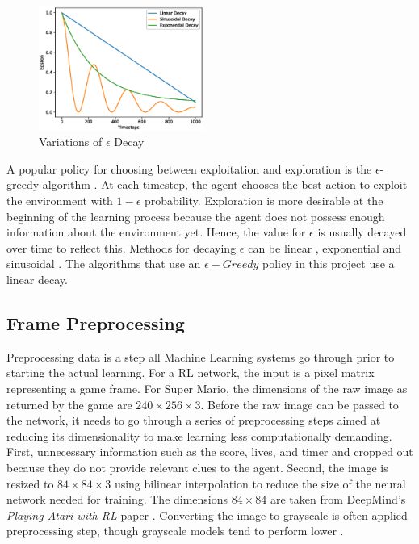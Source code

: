 \documentclass[notitlepage,a4paper,11pt]{article}
\begin{document}
\begin{figure}
\vspace{-40pt}
  \begin{center}
    \includegraphics[width=0.48\textwidth]{figs/epsilon_decay.eps}
  \end{center}
  \vspace{-20pt}
  \caption{Variations of $\epsilon$ Decay}
\end{figure}

A popular policy for choosing between exploitation and exploration is the $\epsilon$-greedy algorithm \cite{white2012bandit}. At each timestep, the agent chooses the best action to exploit the environment with $1-\epsilon$ probability. Exploration is more desirable at the beginning of the learning process because the agent does not possess enough information about the environment yet. Hence, the value for $\epsilon$ is usually decayed over time to reflect this. Methods for decaying $\epsilon$ can be linear \cite{mnih2015human}, exponential \cite{maroti2019rbed} and sinusoidal  \cite{chuchro2017game}. The algorithms that use an $\epsilon-Greedy$ policy in this project use a linear decay.


\subsection{Frame Preprocessing} \label{frame_preprocessing}
Preprocessing data is a step all Machine Learning systems go through prior to starting the actual learning. For a RL network, the input is a pixel matrix representing a game frame. For Super Mario, the dimensions of the raw image as returned by the game are $240 \times 256 \times 3$. Before the raw image can be passed to the network, it needs to go through a series of preprocessing steps aimed at reducing its dimensionality to make learning less computationally demanding. First, unnecessary information such as the score, lives, and timer and cropped out because they do not provide relevant clues to the agent. Second, the image is resized to $84 \times 84 \times 3$ using bilinear interpolation \cite{gribbon2004novel} to reduce the size of the neural network needed for training. The dimensions $84 \times 84$ are taken from DeepMind's \textit{Playing Atari with RL} paper \cite{DBLP:journals/corr/MnihKSGAWR13}. Converting the image to grayscale is often applied preprocessing step, though grayscale models tend to perform lower \cite{lample2017playing}.
\end{document}
